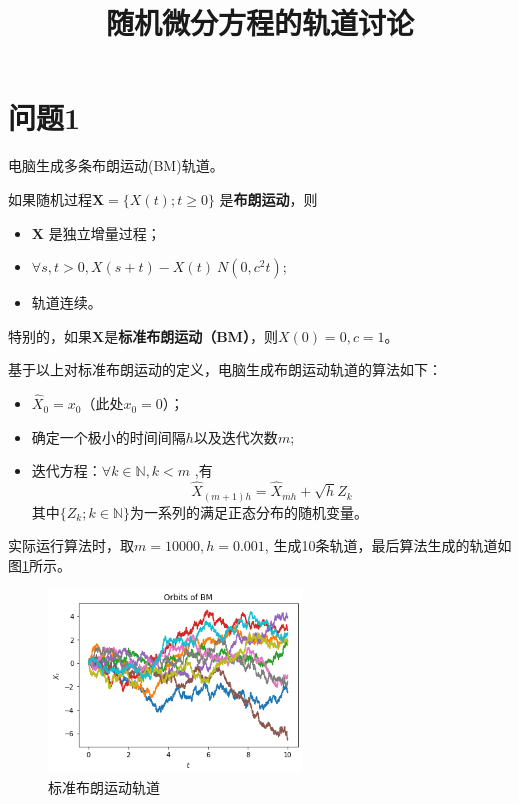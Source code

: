 \documentclass{article}
\title{随机微分方程的轨道讨论}
\author{}
\begin{document}
\maketitle

\section{问题1}

\begin{mdframed} [%
	roundcorner=5pt,
	linecolor=gray!50,
	outerlinewidth=0.5pt,
	middlelinewidth=0.3pt, backgroundcolor=gray!2,
innertopmargin=\topskip, frametitle={问题1},
frametitlefont= \bfseries,frametitlerule=true,frametitlealignment =\raggedright\noindent,
frametitlerulewidth=.5pt, frametitlebackgroundcolor=gray!2,]
电脑生成多条布朗运动(BM)轨道。
\end{mdframed}

如果随机过程$\boldsymbol{X} = \{ X(t) ; t \geq 0 \}$ 是\textbf{布朗运动}，则

\begin{itemize}
\item $\boldsymbol{X}$ 是独立增量过程；
\item $ \forall s,t > 0, X(s+t) - X(t) ~ N(0, c^2 t) $;
\item 轨道连续。
\end{itemize}

特别的，如果$\boldsymbol{X}$是\textbf{标准布朗运动（BM）}，则$X(0) = 0, c = 1$。

基于以上对标准布朗运动的定义，电脑生成布朗运动轨道的算法如下：

\begin{itemize}
\item $\widehat{X}_0 = x_0$（此处$x_0 = 0$）；
\item 确定一个极小的时间间隔$h$以及迭代次数$m$;
\item 迭代方程：$\forall k \in \mathbb{N},k < m$ ,有
$$
\widehat{X}_{(m+1)h} = \widehat{X}_{mh} + \sqrt{h}Z_k
$$
其中$\{Z_k;k \in \mathbb{N}\}$为一系列的满足正态分布的随机变量。
\end{itemize}

实际运行算法时，取$m = 10000, h = 0.001$, 生成10条轨道，最后算法生成的轨道如图\ref{fig:BM}所示。

\begin{figure}[H]
\centering
\includegraphics[width=0.6\textwidth]{figures/BM Orbit.png}
\caption{\label{fig:BM}标准布朗运动轨道}
\end{figure}
\end{document}
